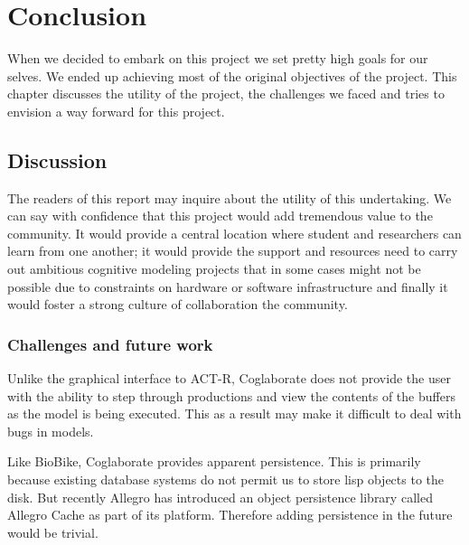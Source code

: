 \chapter{Conclusion}
\label{chap-seven}

When we decided to embark on this project we set pretty high goals for
our selves. We ended up achieving most of the original objectives of
the project. This chapter discusses the utility of the project, the
challenges we faced and tries to envision a way forward for this project.

\section{Discussion}

The readers of this report may inquire about the utility of this
undertaking. We can say with confidence that this project would add
tremendous value to the community. It would provide a central location
where student and researchers can learn from one another; it would
provide the support and resources need to carry out ambitious
cognitive modeling projects that in some cases might not be possible
due to constraints on hardware or software infrastructure and finally
it would foster a strong culture of collaboration the community.

\subsection{Challenges and future work}


Unlike the graphical interface to ACT-R, Coglaborate does not provide
the user with the ability to step through productions and view the
contents of the buffers as the model is being executed. This as a
result may make it difficult to deal with bugs in models. 

Like BioBike, Coglaborate provides apparent persistence. This is
primarily because existing database systems do not permit us to store
lisp objects to the disk. But recently Allegro has introduced an
object persistence library called Allegro Cache as part of its
platform. Therefore adding persistence in the future would be trivial.



